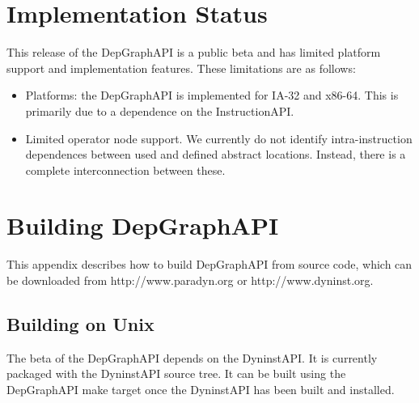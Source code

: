 \documentclass[12pt]{article}
\begin{document}
\section{Implementation Status}

This release of the DepGraphAPI is a public beta and has limited
platform support and implementation features. These limitations are as
follows:
\begin{itemize}
\item Platforms: the DepGraphAPI is implemented for IA-32 and
  x86-64. This is primarily due to a dependence on the InstructionAPI.
\item Limited operator node support. We currently do not identify
  intra-instruction dependences between used and defined abstract
  locations. Instead, there is a complete interconnection between
  these. 
\end{itemize}


\section{Building DepGraphAPI}
This appendix describes how to build DepGraphAPI from source code,
which can be downloaded from http://www.paradyn.org or
http://www.dyninst.org.

\subsection{Building on Unix}
The beta of the DepGraphAPI depends on the DyninstAPI. It is currently
packaged with the DyninstAPI source tree. It can be built using the
DepGraphAPI make target once the DyninstAPI has been built and
installed.
\end{document}
